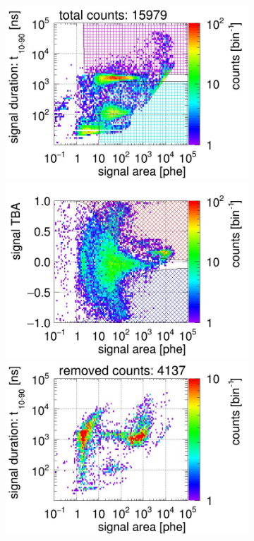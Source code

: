 \begin{landscape}
\begin{figure}[!p]
\begin{subfigure}[t]{0.33\textwidth}
			\includegraphics[width=\figurewidth,clip,trim={0 98 0 0}]{Figures/GasTest/CutsValid/res64769/pdpa26Vecfig64769.jpg}
			\includegraphics[width=\figurewidth,clip,trim={0 98 0 40}]{Figures/GasTest/CutsValid/res64769/tbapa26Vecfig64769.jpg}
			\includegraphics[width=\figurewidth,clip,trim={0 98 0 10}]{Figures/GasTest/CutsValid/res64769/pdpaX26Vecfig64769.jpg}

\end{subfigure}
\end{figure}
\end{landscape}
